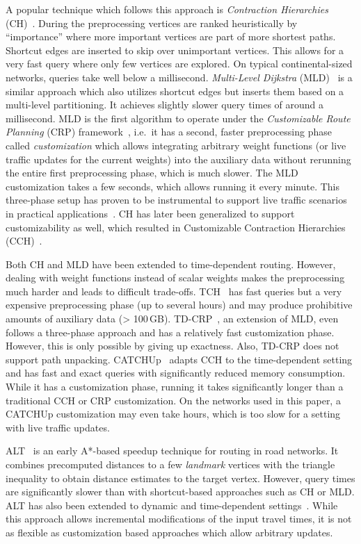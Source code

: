 \documentclass[a4paper,UKenglish,cleveref, autoref, thm-restate,anonymous]{lipics-v2021}
\begin{document}
A popular technique which follows this approach is \emph{Contraction Hierarchies} (CH)~\cite{gssv-erlrn-12}.
During the preprocessing vertices are ranked heuristically by ``importance'' where more important vertices are part of more shortest paths.
Shortcut edges are inserted to skip over unimportant vertices.
This allows for a very fast query where only few vertices are explored.
On typical continental-sized networks, queries take well below a millisecond.
\emph{Multi-Level Dijkstra} (MLD)~\cite{swz-umlgt-02} is a similar approach which also utilizes shortcut edges but inserts them based on a multi-level partitioning.
It achieves slightly slower query times of around a millisecond.
MLD is the first algorithm to operate under the \emph{Customizable Route Planning} (CRP) framework~\cite{dgpw-crprn-13}, i.e.\ it has a second, faster preprocessing phase called \emph{customization} which allows integrating arbitrary weight functions (or live traffic updates for the current weights) into the auxiliary data without rerunning the entire first preprocessing phase, which is much slower.
The MLD customization takes a few seconds, which allows running it every minute.
This three-phase setup has proven to be instrumental to support live traffic scenarios in practical applications~\cite{bingblog}. %
CH has later been generalized to support customizability as well, which resulted in Customizable Contraction Hierarchies (CCH)~\cite{dsw-cch-15}.

Both CH and MLD have been extended to time-dependent routing.
However, dealing with weight functions instead of scalar weights makes the preprocessing much harder and leads to difficult trade-offs.
TCH~\cite{bgsv-mtdtt-13} has fast queries but a very expensive preprocessing phase (up to several hours) and may produce prohibitive amounts of auxiliary data (> 100\,GB).
TD-CRP~\cite{bdpw-dtdrp-16}, an extension of MLD, even follows a three-phase approach and has a relatively fast customization phase.
However, this is only possible by giving up exactness.
Also, TD-CRP does not support path unpacking.
CATCHUp~\cite{swz-sfert-21} adapts CCH to the time-dependent setting and has fast and exact queries with significantly reduced memory consumption.
While it has a customization phase, running it takes significantly longer than a traditional CCH or CRP customization.
On the networks used in this paper, a CATCHUp customization may even take hours, which is too slow for a setting with live traffic updates.

ALT~\cite{gh-cspas-05,gw-cppsp-05} is an early A*-based speedup technique for routing in road networks.
It combines precomputed distances to a few \emph{landmark} vertices with the triangle inequality to obtain distance estimates to the target vertex.
However, query times are significantly slower than with shortcut-based approaches such as CH or MLD.
ALT has also been extended to dynamic and time-dependent settings~\cite{dn-crdtd-12}. %
While this approach allows incremental modifications of the input travel times, it is not as flexible as customization based approaches which allow arbitrary updates.
\end{document}
